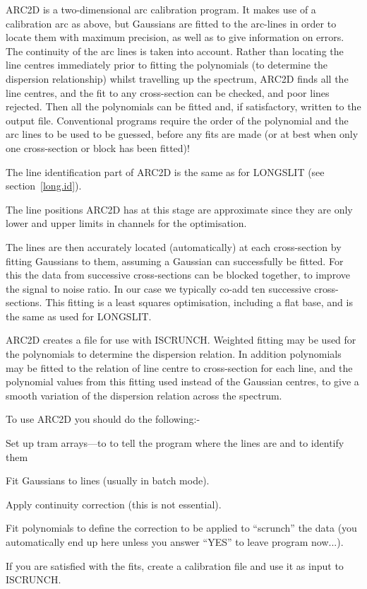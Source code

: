 ARC2D is a two-dimensional arc calibration program. It makes use of a
calibration arc as above, but Gaussians are fitted to the arc-lines in
order to locate them with maximum precision, as well as to give
information on errors. The continuity of the arc lines is taken into
account. Rather than locating the line centres immediately prior to
fitting the polynomials (to determine the dispersion relationship)
whilst travelling up the spectrum, ARC2D finds all the line centres,
and the fit to any cross-section can be checked, and poor lines
rejected. Then all the polynomials can be fitted and, if satisfactory,
written to the output file. Conventional programs require the order of
the polynomial and the arc lines to be used to be guessed, before any
fits are made (or at best when only one cross-section or block has been
fitted)!

The line identification part of ARC2D is the same as for LONGSLIT (see
section~\ref{long.id}).

The line positions ARC2D has at this stage are approximate since they
are only lower and upper limits in channels for the optimisation.

The lines are then accurately located (automatically) at each
cross-section by fitting Gaussians to them, assuming a Gaussian can
successfully be fitted. For this the data from successive
cross-sections can be blocked together, to improve the signal to noise
ratio. In our case we typically co-add ten successive cross-sections.
This fitting is a least squares optimisation, including a flat base,
and is the same as used for LONGSLIT.

ARC2D creates a file for use with ISCRUNCH.
Weighted fitting may be used for the
polynomials to determine the dispersion relation. In addition
polynomials may be fitted to the relation of line centre to
cross-section for each line, and the polynomial values from this
fitting used instead of the Gaussian centres, to give a smooth
variation of the dispersion relation across the spectrum.

  To use ARC2D you should do the following:-
\begin{list}{()}{}
\item Set up tram arrays---to to tell the program where the lines are
and to identify them
\item Fit Gaussians to lines (usually in batch mode).
\item Apply continuity correction (this is not essential).
\item Fit polynomials to define the correction to be applied to
``scrunch'' the data (you automatically end up here unless you answer
``YES'' to leave program now...).
\item If you are satisfied with the fits, create a calibration file and
use it as input to ISCRUNCH.
\end{list}

